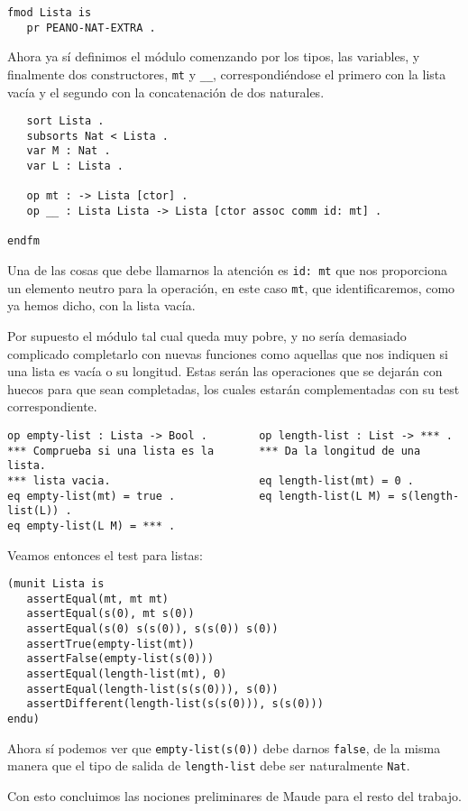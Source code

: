 {\codesize
\begin{verbatim}
fmod Lista is
   pr PEANO-NAT-EXTRA .
\end{verbatim}
}

Ahora ya sí definimos el módulo comenzando por los tipos, las variables, y finalmente dos constructores, \verb"mt" y \verb"__", correspondiéndose el primero con la lista vacía y el segundo con la concatenación de dos naturales. \par

{\codesize
\begin{verbatim}
   sort Lista .
   subsorts Nat < Lista .
   var M : Nat .
   var L : Lista .	

   op mt : -> Lista [ctor] .
   op __ : Lista Lista -> Lista [ctor assoc comm id: mt] .

endfm
\end{verbatim}
}

Una de las cosas que debe llamarnos la atención es \verb"id: mt" que nos proporciona un elemento neutro para la operación, en este caso \texttt{mt}, que identificaremos, como ya hemos dicho, con la lista vacía. \par

Por supuesto el módulo tal cual queda muy pobre, y no sería demasiado complicado completarlo con nuevas funciones como aquellas que nos indiquen si una lista es vacía o su longitud. Estas serán las operaciones que  se dejarán con huecos para que sean completadas, los cuales estarán complementadas con su test correspondiente. \par

{\codesize
\begin{verbatim}
op empty-list : Lista -> Bool .        op length-list : List -> *** .
*** Comprueba si una lista es la       *** Da la longitud de una lista.
*** lista vacia.                       eq length-list(mt) = 0 .
eq empty-list(mt) = true .             eq length-list(L M) = s(length-list(L)) .                    
eq empty-list(L M) = *** .                        
\end{verbatim}
}

Veamos entonces el test para listas: \par

\begin{verbatim}
(munit Lista is
   assertEqual(mt, mt mt)
   assertEqual(s(0), mt s(0))
   assertEqual(s(0) s(s(0)), s(s(0)) s(0))
   assertTrue(empty-list(mt))
   assertFalse(empty-list(s(0)))
   assertEqual(length-list(mt), 0)
   assertEqual(length-list(s(s(0))), s(0))
   assertDifferent(length-list(s(s(0))), s(s(0)))
endu)
\end{verbatim}

Ahora sí podemos ver que \verb"empty-list(s(0))" debe darnos \texttt{false}, de la misma manera que el tipo de salida de \verb"length-list" debe ser naturalmente \texttt{Nat}.\par 

Con esto concluimos las nociones preliminares de Maude para el resto del trabajo.\par 

